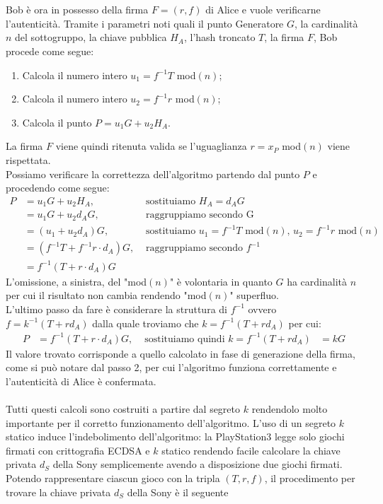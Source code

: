 \documentclass[a4paper,12pt]{tesiinfo}
\begin{document}
\\
\\
Bob \`e ora in possesso della firma $F = (r, f)$ di Alice e vuole verificarne l'autenticit\`a. Tramite i parametri noti quali il punto Generatore $G$, la cardinalit\`a $n$ del sottogruppo, la chiave pubblica $H_A$, l'hash troncato $T$, la firma $F$, Bob procede come segue:
\begin{enumerate}
    \item Calcola il numero intero $u_1 = f^{-1}T$ mod$(n)$;
    \item Calcola il numero intero $u_2 = f^{-1}r$ mod$(n)$;
    \item Calcola il punto $P = u_1G + u_2H_A$.
\end{enumerate}
La firma $F$ viene quindi ritenuta valida se l'uguaglianza $r = x_P $ mod$(n)$ viene rispettata.
\\
Possiamo verificare la correttezza dell'algoritmo partendo dal punto $P$ e procedendo come segue:
\begin{align*}
    P &= u_1G + u_2H_A, &\text{ sostituiamo } H_A = d_AG\\
    &= u_1G + u_2d_AG, &\text{ raggruppiamo secondo G }\\
    &= (u_1 + u_2d_A)G, &\text{ sostituiamo } u_1 = f^{-1}T \text{ mod$(n)$, } u_2 = f^{-1}r\text{ mod$(n)$}\\
    &= (f^{-1}T + f^{-1}r \cdot d_A)G, &\text{ raggruppiamo secondo } f^{-1}\\
    &= f^{-1}(T + r \cdot d_A)G
\end{align*}
L'omissione, a sinistra, del "mod$(n)$" \`e volontaria in quanto $G$ ha cardinalit\`a $n$ per cui il risultato non cambia rendendo "mod$(n)$" superfluo.
\\
L'ultimo passo da fare \`e considerare la struttura di $f^{-1}$ ovvero $f = k^{-1} (T+rd_A)$ dalla quale troviamo che $k = f^{-1} (T+rd_A)$ per cui:
\begin{align*}
    P &= f^{-1}(T + r \cdot d_A)G, &\text{ sostituiamo quindi } k = f^{-1} (T+rd_A)
    &= kG
\end{align*}
Il valore trovato corrisponde a quello calcolato in fase di generazione della firma, come si pu\`o notare dal passo 2, per cui l'algoritmo funziona correttamente e l'autenticit\`a di Alice \`e confermata.
\\
\\
Tutti questi calcoli sono costruiti a partire dal segreto $k$ rendendolo molto importante per il corretto funzionamento dell'algoritmo. L'uso di un segreto $k$ statico induce l'indebolimento dell'algoritmo: la PlayStation3 legge solo giochi firmati con crittografia ECDSA e $k$ statico rendendo facile calcolare la chiave privata $d_S$ della Sony semplicemente avendo a disposizione due giochi firmati. Potendo rappresentare ciascun gioco con la tripla $(T, r, f)$, il procedimento per trovare la chiave privata $d_S$ della Sony \`e il seguente
\end{document}

